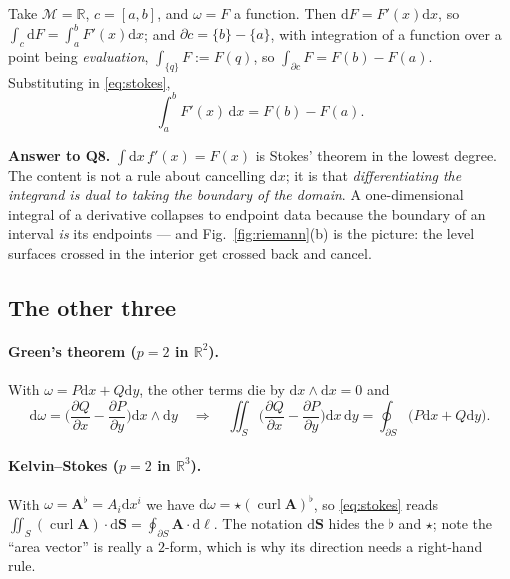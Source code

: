 \documentclass[10pt,a4paper]{article}
\newcommand{\dd}{\mathrm{d}}
\newcommand{\R}{\mathbb{R}}
\newcommand{\M}{\mathcal{M}}
\newcommand{\pd}[2]{\frac{\partial #1}{\partial #2}}
\newcommand{\A}{\mathbf{A}}
\DeclareMathOperator{\curl}{curl}
\theoremstyle{plain}
\theoremstyle{definition}
\numberwithin{equation}{section}
\begin{document}
Take $\M=\R$, $c=[a,b]$, and $\omega=F$ a function. Then $\dd F=F'(x)\dd x$, so
$\int_c\dd F=\int_a^bF'(x)\dd x$; and $\partial c=\{b\}-\{a\}$, with integration of a function
over a point being \emph{evaluation}, $\int_{\{q\}}F:=F(q)$, so $\int_{\partial c}F=F(b)-F(a)$.
Substituting in \eqref{eq:stokes},
\begin{equation}
\boxed{\ \int_a^bF'(x)\,\dd x=F(b)-F(a).\ }
\label{eq:ftc}
\end{equation}

\begin{keybox}
\textbf{Answer to Q8.} $\int\dd x\,f'(x)=F(x)$ is Stokes' theorem in the lowest degree. The
content is not a rule about cancelling $\dd x$; it is that \emph{differentiating the integrand
is dual to taking the boundary of the domain}. A one-dimensional integral of a derivative
collapses to endpoint data because the boundary of an interval \emph{is} its endpoints --- and
Fig.~\ref{fig:riemann}(b) is the picture: the level surfaces crossed in the interior get
crossed back and cancel.
\end{keybox}

\subsection{The other three}

\paragraph{Green's theorem ($p=2$ in $\R^2$).} With $\omega=P\dd x+Q\dd y$, the other terms die
by $\dd x\wedge\dd x=0$ and
\begin{equation}
\dd\omega=\Big(\pd{Q}{x}-\pd{P}{y}\Big)\dd x\wedge\dd y
\quad\Longrightarrow\quad
\iint_S\Big(\pd{Q}{x}-\pd{P}{y}\Big)\dd x\,\dd y=\oint_{\partial S}\big(P\dd x+Q\dd y\big).
\label{eq:green2d}
\end{equation}

\paragraph{Kelvin--Stokes ($p=2$ in $\R^3$).} With $\omega=\A^\flat=A_i\dd x^i$ we have
$\dd\omega=\star(\curl\A)^\flat$, so \eqref{eq:stokes} reads
$\iint_S(\curl\A)\cdot\dd\mathbf S=\oint_{\partial S}\A\cdot\dd\boldsymbol\ell$. The notation
$\dd\mathbf S$ hides the $\flat$ and $\star$; note the ``area vector'' is really a $2$-form,
which is why its direction needs a right-hand rule.
\end{document}
